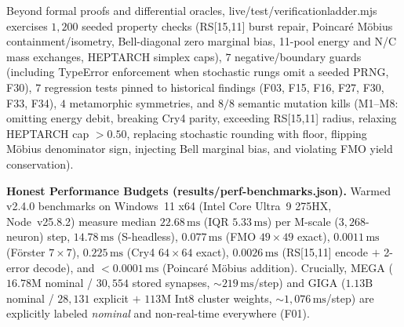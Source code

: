\documentclass[11pt,a4paper]{article}
\numberwithin{equation}{section}
\theoremstyle{plain}
\theoremstyle{definition}
\theoremstyle{remark}
\newcommand{\code}[1]{{\ttfamily\footnotesize\def\_{\textunderscore\penalty0\hskip0pt}#1}}
\begin{document}
Beyond formal proofs and differential oracles, \code{live/test/verification\_ladder.mjs} exercises $1{,}200$ seeded property checks (\code{RS[15,11]} burst repair, Poincar\'e M\"obius containment/isometry, Bell-diagonal zero marginal bias, 11-pool energy and N/C mass exchanges, \code{HEPTARCH} simplex caps), $7$ negative/boundary guards (including \code{TypeError} enforcement when stochastic rungs omit a seeded PRNG, \code{F30}), $7$ regression tests pinned to historical findings (\code{F03, F15, F16, F27, F30, F33, F34}), $4$ metamorphic symmetries, and $8/8$ semantic mutation kills (\code{M1--M8}: omitting energy debit, breaking Cry4 parity, exceeding \code{RS[15,11]} radius, relaxing \code{HEPTARCH} cap $>0.50$, replacing stochastic rounding with floor, flipping M\"obius denominator sign, injecting Bell marginal bias, and violating FMO yield conservation).

\textbf{Honest Performance Budgets (\code{results/\allowbreak perf-\allowbreak benchmarks.json}).} Warmed \code{v2.4.0} benchmarks on Windows~11 x64 (Intel Core Ultra~9 275HX, Node~\code{v25.8.2}) measure median $22.68\,\mathrm{ms}$ (IQR $5.33\,\mathrm{ms}$) per M-scale ($3{,}268$-neuron) step, $14.78\,\mathrm{ms}$ (S-headless), $0.077\,\mathrm{ms}$ (FMO $49\times 49$ exact), $0.0011\,\mathrm{ms}$ (F\"orster $7\times 7$), $0.225\,\mathrm{ms}$ (Cry4 $64\times 64$ exact), $0.0026\,\mathrm{ms}$ (\code{RS[15,11]} encode $+$ 2-error decode), and $<0.0001\,\mathrm{ms}$ (Poincar\'e M\"obius addition). Crucially, \code{MEGA} ($16.78\mathrm{M}$ nominal / $30{,}554$ stored synapses, $\sim 219\,\mathrm{ms}$/step) and \code{GIGA} ($1.13\mathrm{B}$ nominal / $28{,}131$ explicit $+$ $113\mathrm{M}$ Int8 cluster weights, $\sim 1{,}076\,\mathrm{ms}$/step) are explicitly labeled \emph{nominal} and non-real-time everywhere (\code{F01}).
\end{document}
